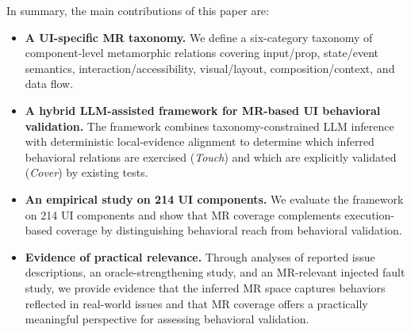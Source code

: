 In summary, the main contributions of this paper are:
\begin{itemize}
    \item \textbf{A UI-specific MR taxonomy.}
    We define a six-category taxonomy of component-level metamorphic relations covering input/prop, state/event semantics, interaction/accessibility, visual/layout, composition/context, and data flow.
    \item \textbf{A hybrid LLM-assisted framework for MR-based UI behavioral validation.}
    The framework combines taxonomy-constrained LLM inference with deterministic local-evidence alignment to determine which inferred behavioral relations are exercised (\textit{Touch}) and which are explicitly validated (\textit{Cover}) by existing tests.
    \item \textbf{An empirical study on 214 UI components.} 
    We evaluate the framework on 214 UI components and show that MR coverage complements execution-based coverage by distinguishing behavioral reach from behavioral validation.
    \item \textbf{Evidence of practical relevance.} Through analyses of reported issue descriptions, an oracle-strengthening study, and an MR-relevant injected fault study, we provide evidence that the inferred MR space captures behaviors reflected in real-world issues and that MR coverage offers a practically meaningful perspective for assessing behavioral validation.
\end{itemize}





 
